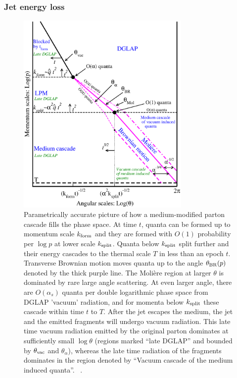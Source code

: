 \subsubsection{Jet energy loss}
\begin{figure}
\centering
\includegraphics[width=0.75\textwidth]{figures/regions4.eps}
\caption[]{Parametrically accurate picture of how a medium-modified parton cascade fills the phase space. At time $t$, quanta can be formed up to momentum scale $k_{\rm form}$ and they are formed with $O(1)$ probability per $\log p$ at lower scale $k_{\rm split}$. Quanta below $k_{\rm split}$ split further and their energy cascades to the thermal scale $T$ in less than an epoch $t$. Transverse Brownian motion moves quanta up to the angle $\theta_{\rm BR}(p)$ denoted by the thick purple line.  The Moli\`ere region at larger $\theta$ is dominated by rare large angle scattering. At even larger angle, there are $O(\alpha_s)$ quanta per double logarithmic phase space  from DGLAP 'vacuum' radiation, and for momenta below $k_{\rm split}$ these cascade within time $t$ to $T$. After the jet escapes the medium, the jet and the emitted fragments will undergo vacuum radiation. This late time vacuum radiation emitted by the original parton dominates at sufficiently small $\log \theta$  (regions marked ``late DGLAP'' and bounded by $\theta_{\rm vac}$ and $\theta_\alpha$),  whereas the late time radiation of the fragments dominates in the region  denoted by ``Vacuum cascade of the medium induced quanta''. ~\cite{Kurkela:2014tla}. }
\label{fig:cascades}
\end{figure}


